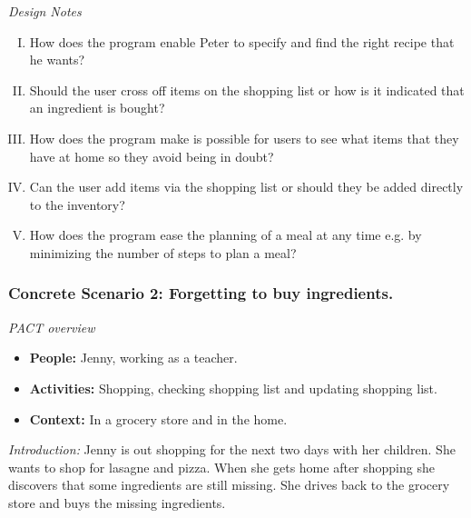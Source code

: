 \emph{Design Notes}

\begin{enumerate} [(I)]
\item How does the program enable Peter to specify and find the right recipe that he wants?
\item Should the user cross off items on the shopping list or how is it indicated that an ingredient is bought?
\item  How does the program make is possible for users to see what items that they have at home so they avoid being in doubt?
\item Can the user add items via the shopping list or should they be added directly to the inventory?
\item How does the program ease the planning of a meal at any time e.g. by minimizing the number of steps to plan a meal?
\end{enumerate}

\subsubsection{Concrete Scenario 2: Forgetting to buy ingredients.}\label{ConcreteScenario2}

\emph{PACT overview}
\begin{itemize}
\item \textbf{People:} Jenny, working as a teacher.
\item \textbf{Activities:} Shopping, checking shopping list and updating shopping list. 
\item \textbf{Context:} In a grocery store and in the home.
\end{itemize}

\emph{Introduction:} Jenny is out shopping for the next two days with her children. She wants to shop for lasagne and pizza. When she gets home after shopping she discovers that some ingredients are still missing. She drives back to the grocery store and buys the missing ingredients. 

